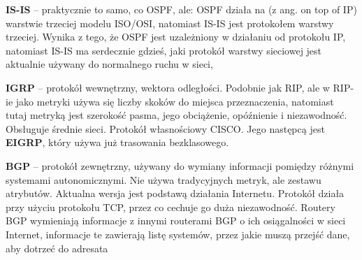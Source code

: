 \textbf{IS-IS} – praktycznie to samo, co OSPF, ale: OSPF działa na (z ang. on top of IP) warstwie trzeciej modelu ISO/OSI, natomiast IS-IS jest protokołem warstwy trzeciej. Wynika z tego, że OSPF jest uzależniony w działaniu od protokołu IP, natomiast IS-IS ma serdecznie gdzieś, jaki protokół warstwy sieciowej jest aktualnie używany do normalnego ruchu w sieci,

\textbf{IGRP} – protokół wewnętrzny, wektora odległości. Podobnie jak RIP, ale w RIP-ie jako metryki używa się liczby skoków do miejsca przeznaczenia, natomiast tutaj metryką jest szerokość pasma, jego obciążenie, opóźnienie i niezawodność. Obsługuje średnie sieci. Protokół własnościowy CISCO. Jego następcą jest \textbf{EIGRP}, który używa już trasowania bezklasowego.

\textbf{BGP} – protokół zewnętrzny, używany do wymiany informacji pomiędzy różnymi systemami autonomicznymi. Nie używa tradycyjnych metryk, ale zestawu atrybutów. Aktualna wersja jest podstawą działania Internetu. Protokół działa przy użyciu protokołu TCP, przez co cechuje go duża niezawodność. Routery BGP wymieniają informacje z innymi routerami BGP o ich osiągalności w sieci Internet, informacje te zawierają listę systemów, przez jakie muszą przejść dane, aby dotrzeć do adresata
